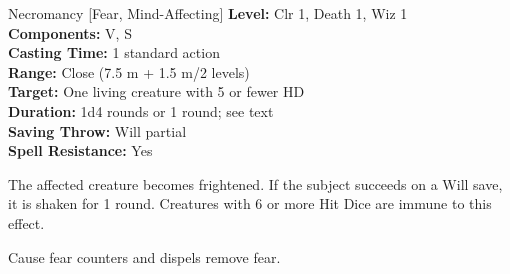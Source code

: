 {Necromancy [Fear, Mind-Affecting]}
{
	\textbf{Level:}
	Clr 1, Death 1, Wiz 1\\
	\textbf{Components:}
	V, S\\
	\textbf{Casting Time:}
	1 standard action\\
	\textbf{Range:}
	Close (7.5 m + 1.5 m/2 levels)\\
	\textbf{Target:}
	One living creature with 5 or fewer HD\\
	\textbf{Duration:}
	1d4 rounds or 1 round; see text\\
	\textbf{Saving Throw:}
	Will partial\\
	\textbf{Spell Resistance:}
	Yes\\
}
{
	The affected creature becomes frightened. If the subject succeeds on a Will save, it is shaken for 1 round. Creatures with 6 or more Hit Dice are immune to this effect.

	Cause fear counters and dispels remove fear.

}

